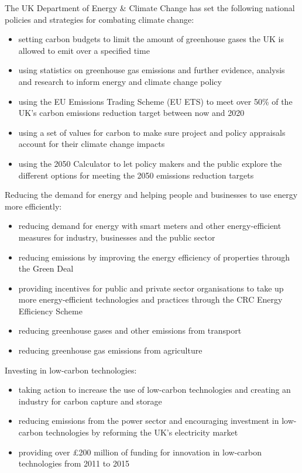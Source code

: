 The UK Department of Energy \& Climate Change has set the following national policies and strategies for combating climate change:
\begin{itemize}
	\item setting carbon budgets to limit the amount of greenhouse gases the UK is allowed to emit over a specified time
	\item using statistics on greenhouse gas emissions and further evidence, analysis and research to inform energy and climate change policy
	\item using the EU Emissions Trading Scheme (EU ETS) to meet over 50\% of the UK’s carbon emissions reduction target between now and 2020
	\item using a set of values for carbon to make sure project and policy appraisals account for their climate change impacts
	\item using the 2050 Calculator to let policy makers and the public explore the different options for meeting the 2050 emissions reduction targets 
\end{itemize}



Reducing the demand for energy and helping people and businesses to use energy more efficiently:
\begin{itemize}
	\item reducing demand for energy with smart meters and other energy-efficient measures for industry, businesses and the public sector
	\item reducing emissions by improving the energy efficiency of properties through the Green Deal
	\item providing incentives for public and private sector organisations to take up more energy-efficient technologies and practices through the CRC Energy Efficiency Scheme 
	\item reducing greenhouse gases and other emissions from transport
	\item reducing greenhouse gas emissions from agriculture
\end{itemize}



Investing in low-carbon technologies:
\begin{itemize}
	\item taking action to increase the use of low-carbon technologies and creating an industry for carbon capture and storage
	\item reducing emissions from the power sector and encouraging investment in low-carbon technologies by reforming the UK’s electricity market
	\item providing over £200 million of funding for innovation in low-carbon technologies from 2011 to 2015
\end{itemize}



